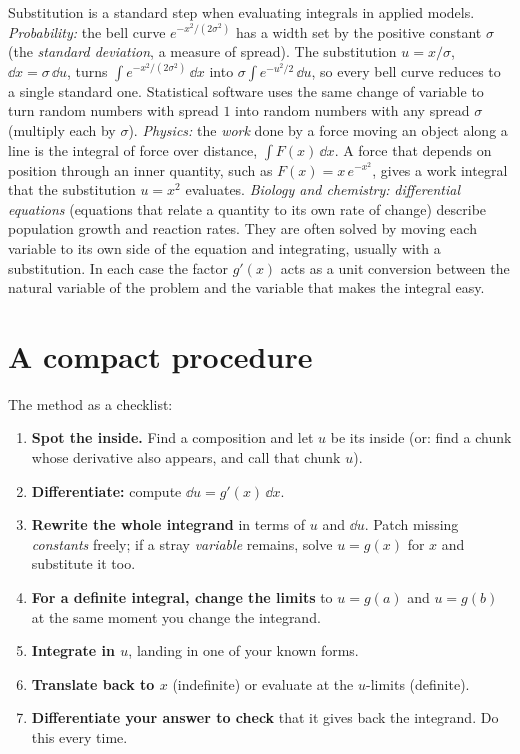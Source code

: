 \begin{applicationbox}
Substitution is a standard step when evaluating integrals in applied models.
\emph{Probability:} the bell curve $e^{-x^2/(2\sigma^2)}$ has a width set by the
positive constant $\sigma$ (the \emph{standard deviation}, a measure of spread).
The substitution $u = x/\sigma$, $\dd x = \sigma\,\dd u$, turns
$\int e^{-x^2/(2\sigma^2)}\,\dd x$ into $\sigma\int e^{-u^2/2}\,\dd u$, so every bell
curve reduces to a single standard one. Statistical software uses the same
change of variable to turn random numbers with spread $1$ into random numbers with
any spread $\sigma$ (multiply each by $\sigma$). \emph{Physics:} the \emph{work} done
by a force moving an object along a line is the integral of force over distance,
$\int F(x)\,\dd x$. A force that depends on position through an inner quantity, such
as $F(x) = x\,e^{-x^2}$, gives a work integral that the substitution $u = x^2$
evaluates. \emph{Biology and chemistry:} \emph{differential equations} (equations
that relate a quantity to its own rate of change) describe population growth and
reaction rates. They are often solved by moving each variable to its own side of the
equation and integrating, usually with a substitution. In each case the factor $g'(x)$ acts as a unit conversion between the
natural variable of the problem and the variable that makes the integral easy.
\end{applicationbox}

\section{A compact procedure}
\label{ch22:procedure}

The method as a checklist:

\begin{enumerate}
\item \textbf{Spot the inside.} Find a composition and let $u$ be its inside (or:
find a chunk whose derivative also appears, and call that chunk $u$).
\item \textbf{Differentiate:} compute $\dd u = g'(x)\,\dd x$.
\item \textbf{Rewrite the whole integrand} in terms of $u$ and $\dd u$. Patch
missing \emph{constants} freely; if a stray \emph{variable} remains, solve $u=g(x)$
for $x$ and substitute it too.
\item \textbf{For a definite integral, change the limits} to $u=g(a)$ and
$u=g(b)$ at the same moment you change the integrand.
\item \textbf{Integrate in $u$}, landing in one of your known forms.
\item \textbf{Translate back to $x$} (indefinite) or evaluate at the
$u$-limits (definite).
\item \textbf{Differentiate your answer to check} that it gives back the
integrand. Do this every time.
\end{enumerate}


